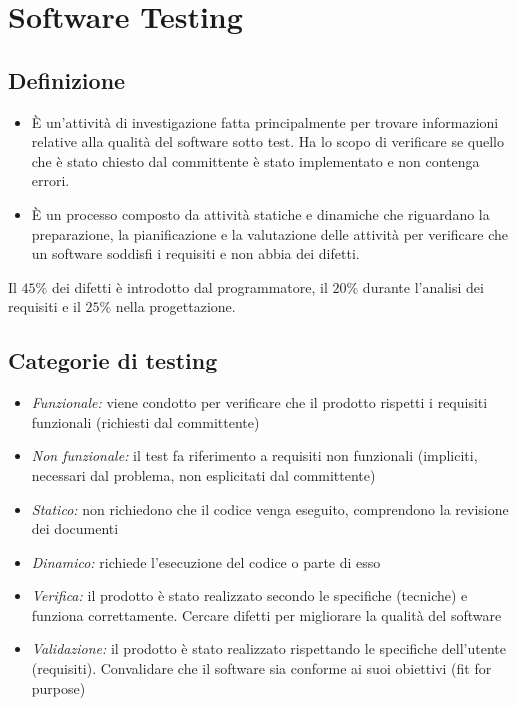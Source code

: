 \documentclass[10pt, a4paper]{article}
\begin{document}
\section{Software Testing}
\subsection{Definizione}
\begin{itemize}
    \item È un'attività di investigazione fatta principalmente per trovare informazioni relative alla qualità del software sotto test. Ha lo scopo di verificare se quello che è stato chiesto dal committente è stato implementato e non contenga errori.
    \item È un processo composto da attività statiche e dinamiche che riguardano la preparazione, la pianificazione e la valutazione delle attività per verificare che un software soddisfi i requisiti e non abbia dei difetti.
\end{itemize}
Il $45\%$ dei difetti è introdotto dal programmatore, il $20\%$ durante l'analisi dei requisiti e il $25\%$ nella progettazione.

\subsection{Categorie di testing}
\begin{itemize}
    \item \textit{Funzionale:} viene condotto per verificare che il prodotto rispetti i requisiti funzionali (richiesti dal committente)
    \item \textit{Non funzionale:} il test fa riferimento a requisiti non funzionali (impliciti, necessari dal problema, non esplicitati dal committente)
    \item \textit{Statico:} non richiedono che il codice venga eseguito, comprendono la revisione dei documenti
    \item \textit{Dinamico:} richiede l'esecuzione del codice o parte di esso
    \item \textit{Verifica:} il prodotto è stato realizzato secondo le specifiche (tecniche) e funziona correttamente. Cercare difetti per migliorare la qualità del software
    \item \textit{Validazione:} il prodotto è stato realizzato rispettando le specifiche dell’utente (requisiti). Convalidare che il software sia conforme ai suoi obiettivi (fit for purpose)
\end{itemize}
\end{document}
